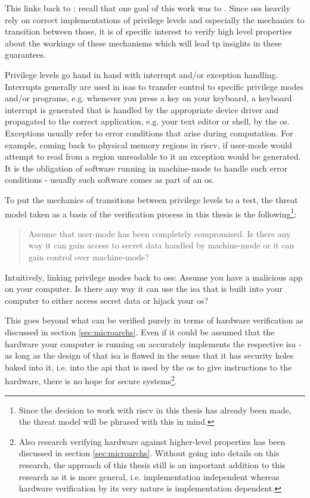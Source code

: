 This links back to \cite{Reid17}; recall that one goal of this work was to .
Since \glspl{os} heavily rely on correct implementations of privilege levels and especially the mechanics to transition between those, it is of specific interest to verify high level properties about the workings of these mechanisms which will lead tp insights in these guarantees.

Privilege levels go hand in hand with interrupt and/or exception handling.
Interrupts generally are used in \glspl{isa} to transfer control to specific privilege modes and/or programs, e.g. whenever you press a key on your keyboard, a keyboard interrupt is generated that is handled by the appropriate device driver and propagated to the correct application, e.g. your text editor or shell, by the \gls{os}.
Exceptions usually refer to error conditions that arise during computation.
For example, coming back to physical memory regions in \gls{riscv}, if user-mode would attempt to read from a region unreadable to it an exception would be generated.
It is the obligation of software running in machine-mode to handle such error conditions - usually such software comes as part of an \gls{os}.

To put the mechanics of transitions between privilege levels to a test, the threat model taken as a basis of the verification process in this thesis is the following\footnote{%
    Since the decision to work with \gls{riscv} in this thesis has already been made, the threat model will be phrased with this in mind.
}:
\begin{quote}
    Assume that user-mode has been completely compromised.
    Is there any way it can gain access to secret data handled by machine-mode or it can gain control over machine-mode?
\end{quote}

Intuitively, linking privilege modes back to \glspl{os}: Assume you have a malicious app on your computer.
Is there any way it can use the \gls{isa} that is built into your computer to either access secret data or hijack your \gls{os}?

This goes beyond what can be verified purely in terms of hardware verification as discussed in section \ref{sec:microarchs}.
Even if it could be assumed that the hardware your computer is running on accurately implements the respective \gls{isa} - as long as the design of that \gls{isa} is flawed in the sense that it has security holes baked into it, i.e. into the \gls{api} that is used by the \gls{os} to give instructions to the hardware, there is no hope for secure systems\footnote{%
    Also research verifying hardware against higher-level properties has been discussed in section \ref{sec:microarchs}.
    Without going into details on this research, the approach of this thesis still is an important addition to this research as it is more general, i.e. implementation independent whereas hardware verification by its very nature is implementation dependent.
}.

